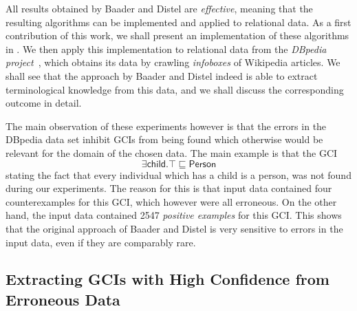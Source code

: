 All results obtained by Baader and Distel are \emph{effective}, meaning that the resulting
algorithms can be implemented and applied to relational data.  As a first contribution of
this work, we shall present an implementation of these algorithms in
.  We then apply this implementation to relational data
from the \emph{DBpedia project}~\cite{DBpedia}, which obtains its data by crawling
\emph{infoboxes} of Wikipedia articles.  We shall see that the approach by Baader and
Distel indeed is able to extract terminological knowledge from this data, and we shall
discuss the corresponding outcome in detail.

The main observation of these experiments however is that the errors in the DBpedia data
set inhibit GCIs from being found which otherwise would be relevant for the domain of the
chosen data.  The main example is that the GCI
\begin{equation*}
  \exists \mathsf{child}. \top \sqsubseteq \mathsf{Person}
\end{equation*}
stating the fact that every individual which has a child is a person, was not found during
our experiments.  The reason for this is that input data contained four counterexamples
for this GCI, which however were all erroneous.  On the other hand, the input data
contained 2547 \emph{positive examples} for this GCI.  This shows that the original
approach of Baader and Distel is very sensitive to errors in the input data, even if they
are comparably rare.

\subsection{Extracting GCIs with High Confidence from Erroneous Data}
\label{sec:extracting-gcis-from}

